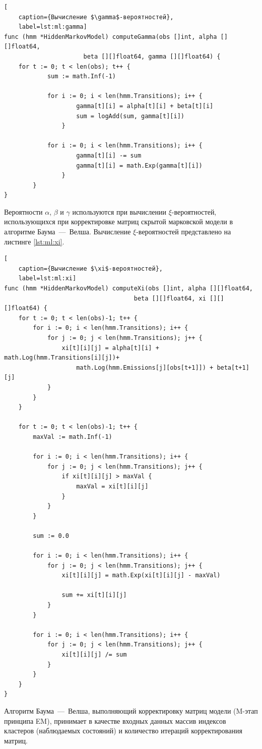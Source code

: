 \begin{lstlisting}[
	caption={Вычисление $\gamma$-вероятностей},
	label=lst:ml:gamma]
func (hmm *HiddenMarkovModel) computeGamma(obs []int, alpha [][]float64, 
					  beta [][]float64, gamma [][]float64) {
	for t := 0; t < len(obs); t++ {
			sum := math.Inf(-1)
			
			for i := 0; i < len(hmm.Transitions); i++ {
					gamma[t][i] = alpha[t][i] + beta[t][i]
					sum = logAdd(sum, gamma[t][i])
				}
			
			for i := 0; i < len(hmm.Transitions); i++ {
					gamma[t][i] -= sum
					gamma[t][i] = math.Exp(gamma[t][i])
				}
		}
}
\end{lstlisting}
Вероятности $\alpha$, $\beta$ и $\gamma$ используются при вычислении $\xi$-вероятностей, использующихся при корректировке матриц скрытой марковской модели в алгоритме Баума~---~Велша. Вычисление $\xi$-вероятностей представлено на листинге  \ref{lst:ml:xi}.
\begin{lstlisting}[
	caption={Вычисление $\xi$-вероятностей},
	label=lst:ml:xi]
func (hmm *HiddenMarkovModel) computeXi(obs []int, alpha [][]float64, 
									beta [][]float64, xi [][][]float64) {
	for t := 0; t < len(obs)-1; t++ {
		for i := 0; i < len(hmm.Transitions); i++ {
			for j := 0; j < len(hmm.Transitions); j++ {
				xi[t][i][j] = alpha[t][i] + math.Log(hmm.Transitions[i][j])+
					math.Log(hmm.Emissions[j][obs[t+1]]) + beta[t+1][j]
			}
		}
	}
	
	for t := 0; t < len(obs)-1; t++ {
		maxVal := math.Inf(-1)
		
		for i := 0; i < len(hmm.Transitions); i++ {
			for j := 0; j < len(hmm.Transitions); j++ {
				if xi[t][i][j] > maxVal {
					maxVal = xi[t][i][j]
				}
			}
		}
		
		sum := 0.0
		
		for i := 0; i < len(hmm.Transitions); i++ {
			for j := 0; j < len(hmm.Transitions); j++ {
				xi[t][i][j] = math.Exp(xi[t][i][j] - maxVal)
				
				sum += xi[t][i][j]
			}
		}
		
		for i := 0; i < len(hmm.Transitions); i++ {
			for j := 0; j < len(hmm.Transitions); j++ {
				xi[t][i][j] /= sum
			}
		}
	}
}
\end{lstlisting}
Алгоритм Баума~---~Велша, выполняющий корректировку матриц модели (M-этап принципа EM), принимает в качестве входных данных массив индексов кластеров (наблюдаемых состояний) и количество итераций корректирования матриц. 

